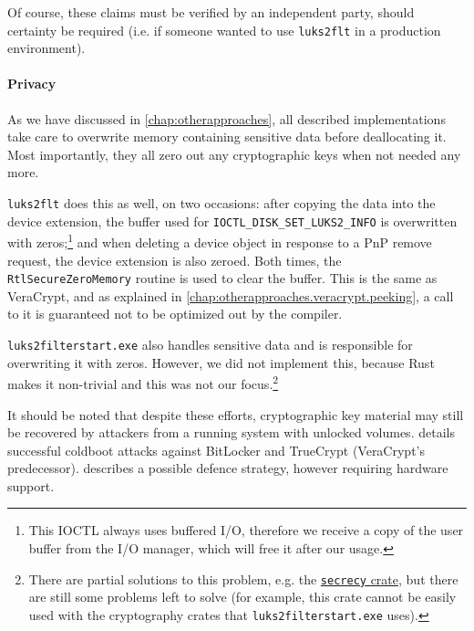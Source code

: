Of course, these claims must be verified by an independent party, should certainty be required (i.e. if someone wanted to use \texttt{luks2flt} in a production environment).

\paragraph{Privacy}
As we have discussed in \autoref{chap:otherapproaches}, all described implementations take care to overwrite memory containing sensitive data before deallocating it. Most importantly, they all zero out any cryptographic keys when not needed any more.

\texttt{luks2flt} does this as well, on two occasions: after copying the data into the device extension, the buffer used for \texttt{IOCTL\_DISK\_SET\_LUKS2\_INFO} is overwritten with zeros;\footnote{\label{fn:ourapproach.security.zeroioctlbuffer} This IOCTL always uses buffered I/O, therefore we receive a copy of the user buffer from the I/O manager, which will free it after our usage.} and when deleting a device object in response to a PnP remove request, the device extension is also zeroed. Both times, the \texttt{RtlSecureZeroMemory} routine is used to clear the buffer. This is the same as VeraCrypt, and as explained in \autoref{chap:otherapproaches.veracrypt.peeking}, a call to it is guaranteed not to be optimized out by the compiler.

\texttt{luks2filterstart.exe} also handles sensitive data and is responsible for overwriting it with zeros. However, we did not implement this, because Rust makes it non-trivial and this was not our focus.\footnote{\label{fn:ourapproach.security.secrecycrate} There are partial solutions to this problem, e.g. the \href{https://crates.io/crates/secrecy}{\texttt{secrecy} crate}, but there are still some problems left to solve (for example, this crate cannot be easily used with the cryptography crates that \texttt{luks2filterstart.exe} uses).}

It should be noted that despite these efforts, cryptographic key material may still be recovered by attackers from a running system with unlocked volumes. \cite{Halderman2008} details successful coldboot attacks against BitLocker and TrueCrypt (VeraCrypt's predecessor). \cite{Guan2018} describes a possible defence strategy, however requiring hardware support.